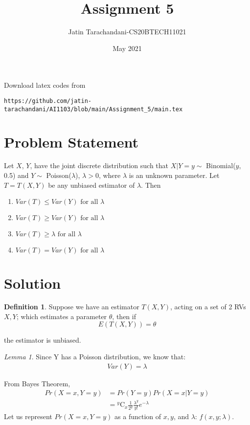 \documentclass[twocolumn]{article}
\title{Assignment 5}
\author{Jatin Tarachandani-CS20BTECH11021}
\date{May 2021}
\newcommand{\comb}[2]{{}^{#1}\mathrm{C}_{#2}}
\providecommand{\brak}[1]{\ensuremath{\left(#1\right)}}
\theoremstyle{remark}
\newtheorem{lemma}[theorem]{Lemma}
\theoremstyle{definition}
\newtheorem{definition}{Definition}[section]
\numberwithin{equation}{subsection}
\begin{document}
\maketitle
Download latex codes from 
%
\begin{lstlisting}
https://github.com/jatin-tarachandani/AI1103/blob/main/Assignment_5/main.tex
\end{lstlisting}
\section{Problem Statement}
Let $X$, $Y$, have the joint discrete distribution such that $X|Y=y \sim$ Binomial($y$, 0.5) and $Y\sim$ Poisson($\lambda$), $\lambda>0$, where $\lambda$ is an unknown parameter. Let $T=T(X, Y)$ be any unbiased estimator of $\lambda$. Then
\begin{enumerate}
    \item  $Var(T) \leq Var(Y)  \text{ for all } \lambda$
    \item $Var(T) \geq Var(Y) \text{ for all } \lambda$
    \item $Var(T) \geq \lambda \text{ for all } \lambda$
    \item $Var(T) = Var(Y) \text{ for all } \lambda$
\end{enumerate}

\section{Solution}
\begin{definition}
Suppose we have an estimator $T(X, Y)$, acting on a set of 2 RVs $X, Y$; which estimates a parameter $\theta$, then if
\begin{equation}
    E\brak{T(X, Y)}=\theta
\end{equation}

the estimator is unbiased. 
\end{definition}

\begin{lemma}
Since Y has a Poisson distribution, we know that:
\begin{align}\label{Var=lam}
Var(Y)=\lambda
\end{align}
\end{lemma}

From Bayes Theorem,
\begin{align}
    Pr\brak{X=x,Y=y}&=Pr\brak{Y=y}  Pr\brak{X=x|Y=y}\\
    &= \comb{y}{x} \frac{1}{2^y} \frac{\lambda^y}{y!} e^{- \lambda}
\end{align}
Let us represent $ Pr\brak{X=x,Y=y}$ as a function of $x, y$, and $\lambda$: $f(x, y;\lambda)$.
\end{document}

